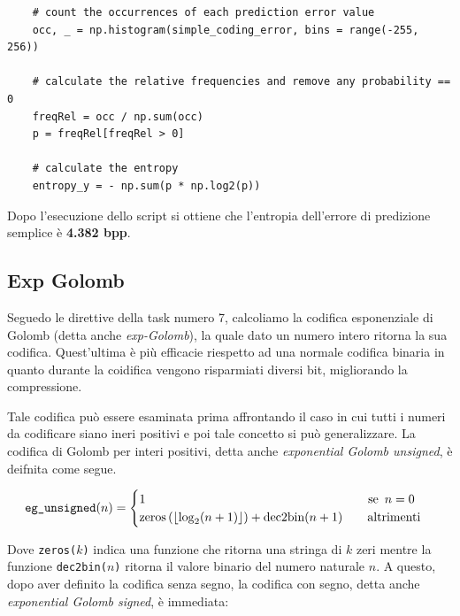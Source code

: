 \begin{lstlisting}
    # count the occurrences of each prediction error value
    occ, _ = np.histogram(simple_coding_error, bins = range(-255, 256))

    # calculate the relative frequencies and remove any probability == 0
    freqRel = occ / np.sum(occ)
    p = freqRel[freqRel > 0]

    # calculate the entropy
    entropy_y = - np.sum(p * np.log2(p))
\end{lstlisting}

\noindent Dopo l'esecuzione dello script si ottiene che l'entropia dell'errore di predizione semplice è \textbf{4.382 bpp}.



\subsection{Exp Golomb}\label{exp-golomb}
Seguedo le direttive della task numero 7, calcoliamo la codifica esponenziale di Golomb (detta anche \textsl{exp-Golomb}), la quale dato un numero intero ritorna la sua codifica. Quest'ultima è più efficacie riespetto ad una normale codifica binaria in quanto durante la coidifica vengono risparmiati diversi bit, migliorando la compressione. 

Tale codifica può essere esaminata prima affrontando il caso in cui tutti i numeri da codificare siano ineri positivi e poi tale concetto si può generalizzare. La codifica di Golomb per interi positivi, detta anche \textsl{exponential Golomb unsigned}, è deifnita come segue.

\begin{gather*}
    \text{\texttt{eg\_unsigned}}(n) =
    \begin{cases}
        1 \hspace{180px} \text{se } \, n = 0 \\
        \text{zeros}\left( \left\lfloor \log_2(n + 1) \right\rfloor \right) + \text{dec2bin}(n + 1) \hspace{20px} \text{altrimenti}
    \end{cases}
\end{gather*}

\noindent Dove \texttt{zeros(}$k$\texttt{)} indica una funzione che ritorna una stringa di $k$ zeri mentre la funzione \texttt{dec2bin(}$n$\texttt{)} ritorna il valore binario del numero naturale $n$. A questo, dopo aver definito la codifica senza segno, la codifica con segno, detta anche \textsl{exponential Golomb signed}, è immediata:

